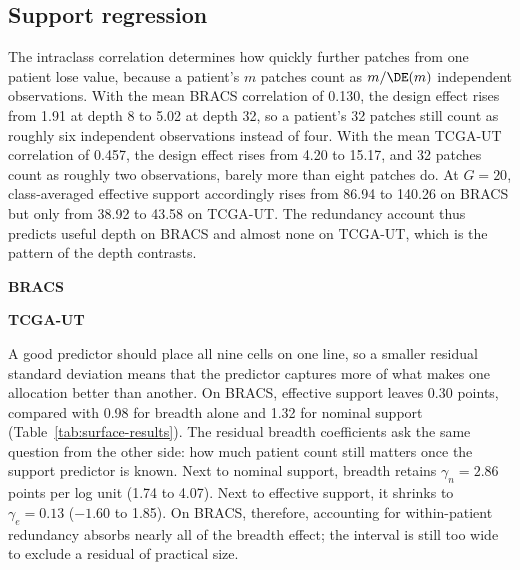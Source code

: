 \subsection{Support regression}
The intraclass correlation determines how quickly further patches from one patient lose value, because a patient's $m$ patches count as $m/\DE(m)$ independent observations. With the mean BRACS correlation of 0.130, the design effect rises from 1.91 at depth 8 to 5.02 at depth 32, so a patient's 32 patches still count as roughly six independent observations instead of four. With the mean TCGA-UT correlation of 0.457, the design effect rises from 4.20 to 15.17, and 32 patches count as roughly two observations, barely more than eight patches do. At $G=20$, class-averaged effective support accordingly rises from 86.94 to 140.26 on BRACS but only from 38.92 to 43.58 on TCGA-UT. The redundancy account thus predicts useful depth on BRACS and almost none on TCGA-UT, which is the pattern of the depth contrasts.

\begin{table}[htbp]
\centering\small
\textbf{BRACS}\par\smallskip

\par\medskip
\textbf{TCGA-UT}\par\smallskip

\caption{Effective support places the nine BRACS cells closest to a single line, whereas on TCGA-UT patient count alone fits at least as well; nominal support fits worst in both cohorts. Each row fits $A=\alpha+\beta\log(\cdot)$ over the nine pooled cell scores. Slopes are percentage points per natural log unit with paired 95\% intervals; residual standard deviations are percentage points with seven residual degrees of freedom and describe in-sample fit, not predictive validation.}
\label{tab:surface-results}
\end{table}

\noindent A good predictor should place all nine cells on one line, so a smaller residual standard deviation means that the predictor captures more of what makes one allocation better than another. On BRACS, effective support leaves 0.30 points, compared with 0.98 for breadth alone and 1.32 for nominal support (Table~\ref{tab:surface-results}). The residual breadth coefficients ask the same question from the other side: how much patient count still matters once the support predictor is known. Next to nominal support, breadth retains $\gamma_n=2.86$ points per log unit (1.74 to 4.07). Next to effective support, it shrinks to $\gamma_e=0.13$ ($-1.60$ to 1.85). On BRACS, therefore, accounting for within-patient redundancy absorbs nearly all of the breadth effect; the interval is still too wide to exclude a residual of practical size.

